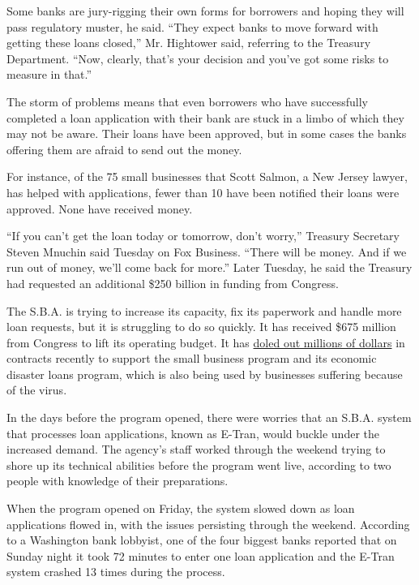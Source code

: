 Some banks are jury-rigging their own forms for borrowers and hoping
they will pass regulatory muster, he said. ``They expect banks to move
forward with getting these loans closed,'' Mr. Hightower said, referring
to the Treasury Department. ``Now, clearly, that's your decision and
you've got some risks to measure in that.''

The storm of problems means that even borrowers who have successfully
completed a loan application with their bank are stuck in a limbo of
which they may not be aware. Their loans have been approved, but in some
cases the banks offering them are afraid to send out the money.

For instance, of the 75 small businesses that Scott Salmon, a New Jersey
lawyer, has helped with applications, fewer than 10 have been notified
their loans were approved. None have received money.

``If you can't get the loan today or tomorrow, don't worry,'' Treasury
Secretary Steven Mnuchin said Tuesday on Fox Business. ``There will be
money. And if we run out of money, we'll come back for more.'' Later
Tuesday, he said the Treasury had requested an additional \$250 billion
in funding from Congress.

The S.B.A. is trying to increase its capacity, fix its paperwork and
handle more loan requests, but it is struggling to do so quickly. It has
received \$675 million from Congress to lift its operating budget. It
has
\href{https://www.nytimes3xbfgragh.onion/2020/04/03/us/politics/small-business-administration-coronavirus.html}{doled
out millions of dollars} in contracts recently to support the small
business program and its economic disaster loans program, which is also
being used by businesses suffering because of the virus.

In the days before the program opened, there were worries that an S.B.A.
system that processes loan applications, known as E-Tran, would buckle
under the increased demand. The agency's staff worked through the
weekend trying to shore up its technical abilities before the program
went live, according to two people with knowledge of their preparations.

When the program opened on Friday, the system slowed down as loan
applications flowed in, with the issues persisting through the weekend.
According to a Washington bank lobbyist, one of the four biggest banks
reported that on Sunday night it took 72 minutes to enter one loan
application and the E-Tran system crashed 13 times during the process.

